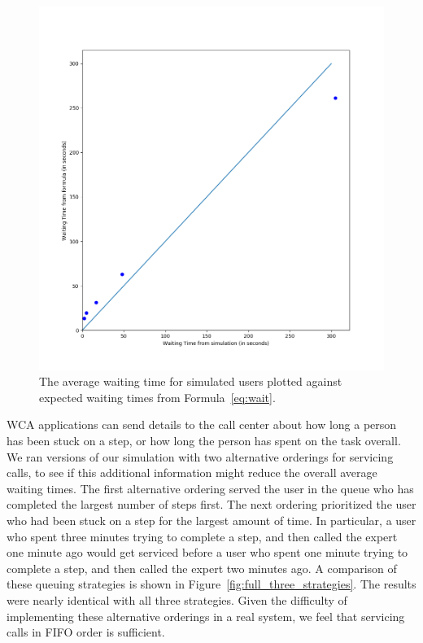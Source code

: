 \begin{figure}[H]
  \includegraphics[width=\textwidth]{figures/montecarlo/gof.png}
  \caption{
    The average waiting time for simulated users plotted against expected
    waiting times from Formula~\ref{eq:wait}.
  }\label{fig:gof}
\end{figure}

WCA applications can send details to the call center about how long a person has
been stuck on a step, or how long the person has spent on the task overall.
We ran versions of our simulation with two alternative orderings for servicing
calls, to see if this additional information might reduce the overall average
waiting times.
The first alternative ordering served the user in the queue who has completed
the largest number of steps first.
The next ordering prioritized the user who had been stuck on a step for the
largest amount of time.
In particular, a user who spent three minutes trying to complete a step, and
then
called the expert one minute ago would get serviced before a user who spent one
minute trying to complete a step, and then called the expert two minutes ago.
A comparison of these queuing strategies is shown in
Figure~\ref{fig:full_three_strategies}.
The results were nearly identical with all three strategies.
Given the difficulty of implementing these alternative orderings in a real
system, we feel that servicing calls in FIFO order is sufficient.

